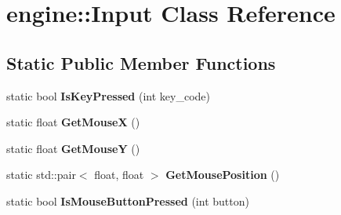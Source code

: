 \hypertarget{classengine_1_1Input}{}\section{engine\+:\+:Input Class Reference}
\label{classengine_1_1Input}
\subsection*{Static Public Member Functions}
\begin{DoxyCompactItemize}
\item
\mbox{\label{classengine_1_1Input_a79ec265ab6800cb0b1f627bfdb3cfc28}}
static bool {\bfseries Is\+Key\+Pressed} (int key\+\_\+code)
\item
\mbox{\label{classengine_1_1Input_a13095584400184088868e6ff9c9f0a5d}}
static float {\bfseries Get\+MouseX} ()
\item
\mbox{\label{classengine_1_1Input_aa6fa67ccfdb48ac903c927157f0809c2}}
static float {\bfseries Get\+MouseY} ()
\item
\mbox{\label{classengine_1_1Input_a4a15d91ac4241fc6dc3584c051e1b50a}}
static std\+::pair$<$ float, float $>$ {\bfseries Get\+Mouse\+Position} ()
\item
\mbox{\label{classengine_1_1Input_acaa32590a2b39e0eb822c01d5b7815dc}}
static bool {\bfseries Is\+Mouse\+Button\+Pressed} (int button)
\end{DoxyCompactItemize}
